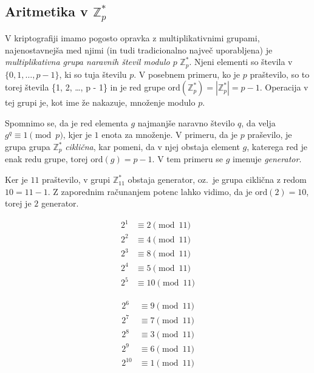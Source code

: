 \documentclass[isrm2, tisk]{fmfdelo}
\newcommand{\Z}{\mathbb Z}
\begin{document}
\subsection{Aritmetika v $\Z_p^*$}
V kriptografiji imamo pogosto opravka z multiplikativnimi grupami, najenostavnejša med njimi (in 
tudi tradicionalno največ uporabljena) je \textit{multiplikativna grupa naravnih števil modulo $p$} 
$\Z_p^*$. Njeni elementi so števila v $\{0, 1, \dots, p - 1\}$, ki so tuja številu $p$. V posebnem 
primeru, ko je $p$ praštevilo, so to torej števila \{1, 2, \dots, p - 1\} in je red grupe 
$\text{ord}(\Z_p^*) = |\Z_p^*| = p - 1$. Operacija v tej grupi je, kot ime že nakazuje, množenje 
modulo $p$.

Spomnimo se, da je red elementa $g$ najmanjše naravno število $q$, da velja $g^q \equiv 1 \pmod p$, 
kjer je $1$ enota za množenje. V primeru, da je $p$ praševilo, je grupa grupa $\Z_p^*$ \textit{ciklična}, 
kar pomeni, da v njej obstaja element $g$, katerega red je enak redu grupe, torej $\text{ord}(g) = p - 1$.
V tem primeru se $g$ imenuje \textit{generator}.

\begin{primer}[Grupa $\Z_{11}^*$]
Ker je $11$ praštevilo, v grupi $\Z_{11}^*$ obstaja generator, oz.\ je grupa ciklična z redom $10 = 
11 - 1$. Z zaporednim računanjem potenc lahko vidimo, da je $\text{ord}(2) = 10$, torej je $2$ 
generator.

\begin{minipage}{0.45\textwidth}
    \begin{align*}
        2^1 &\equiv 2 \pmod{11} \\
        2^2 &\equiv 4 \pmod{11} \\
        2^3 &\equiv 8 \pmod{11} \\
        2^4 &\equiv 5 \pmod{11} \\
        2^5 &\equiv 10 \pmod{11} 
    \end{align*}
\end{minipage}
\begin{minipage}{0.45\textwidth}
    \begin{align*}
        2^6 &\equiv 9 \pmod{11} \\
        2^7 &\equiv 7 \pmod{11} \\
        2^8 &\equiv 3 \pmod{11} \\
        2^9 &\equiv 6 \pmod{11} \\
        2^{10} &\equiv 1 \pmod{11} 
    \end{align*}
\end{minipage}

\end{primer}
\end{document}
